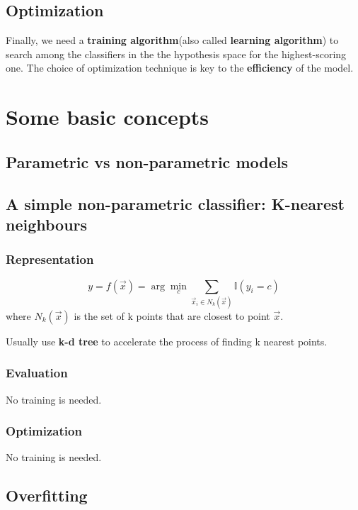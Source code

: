 \subsection{Optimization}
Finally, we need a \textbf{training algorithm}(also called \textbf{learning algorithm}) to search among the classifiers in the the hypothesis space for the highest-scoring one. The choice of optimization technique is key to the \textbf{efficiency} of the model.


\section{Some basic concepts}


\subsection{Parametric vs non-parametric models}


\subsection{A simple non-parametric classifier: K-nearest neighbours}

\subsubsection{Representation}
\begin{equation}
y=f(\vec{x})=\arg\min_{c}{\sum\limits_{\vec{x}_i \in N_k(\vec{x})} \mathbb{I}(y_i=c)}
\end{equation}
where $N_k(\vec{x})$ is the set of k points that are closest to point $\vec{x}$.

Usually use \textbf{k-d tree} to accelerate the process of finding k nearest points.

\subsubsection{Evaluation}
No training is needed.

\subsubsection{Optimization}
No training is needed.


\subsection{Overfitting}


